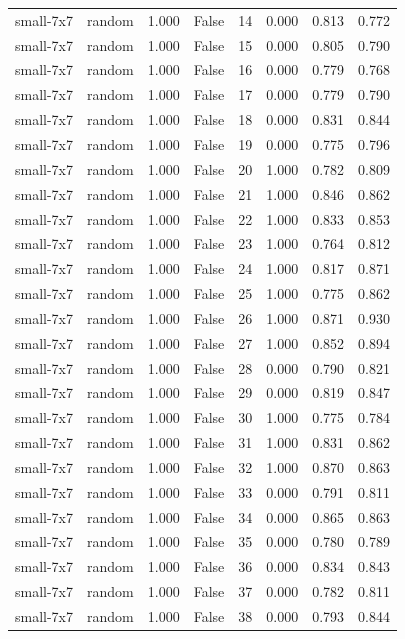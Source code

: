 \begin{tabular}{llrrrrrr}
small-7x7 & random & 1.000 & False & 14 & 0.000 & 0.813 & 0.772 \\
small-7x7 & random & 1.000 & False & 15 & 0.000 & 0.805 & 0.790 \\
small-7x7 & random & 1.000 & False & 16 & 0.000 & 0.779 & 0.768 \\
small-7x7 & random & 1.000 & False & 17 & 0.000 & 0.779 & 0.790 \\
small-7x7 & random & 1.000 & False & 18 & 0.000 & 0.831 & 0.844 \\
small-7x7 & random & 1.000 & False & 19 & 0.000 & 0.775 & 0.796 \\
small-7x7 & random & 1.000 & False & 20 & 1.000 & 0.782 & 0.809 \\
small-7x7 & random & 1.000 & False & 21 & 1.000 & 0.846 & 0.862 \\
small-7x7 & random & 1.000 & False & 22 & 1.000 & 0.833 & 0.853 \\
small-7x7 & random & 1.000 & False & 23 & 1.000 & 0.764 & 0.812 \\
small-7x7 & random & 1.000 & False & 24 & 1.000 & 0.817 & 0.871 \\
small-7x7 & random & 1.000 & False & 25 & 1.000 & 0.775 & 0.862 \\
small-7x7 & random & 1.000 & False & 26 & 1.000 & 0.871 & 0.930 \\
small-7x7 & random & 1.000 & False & 27 & 1.000 & 0.852 & 0.894 \\
small-7x7 & random & 1.000 & False & 28 & 0.000 & 0.790 & 0.821 \\
small-7x7 & random & 1.000 & False & 29 & 0.000 & 0.819 & 0.847 \\
small-7x7 & random & 1.000 & False & 30 & 1.000 & 0.775 & 0.784 \\
small-7x7 & random & 1.000 & False & 31 & 1.000 & 0.831 & 0.862 \\
small-7x7 & random & 1.000 & False & 32 & 1.000 & 0.870 & 0.863 \\
small-7x7 & random & 1.000 & False & 33 & 0.000 & 0.791 & 0.811 \\
small-7x7 & random & 1.000 & False & 34 & 0.000 & 0.865 & 0.863 \\
small-7x7 & random & 1.000 & False & 35 & 0.000 & 0.780 & 0.789 \\
small-7x7 & random & 1.000 & False & 36 & 0.000 & 0.834 & 0.843 \\
small-7x7 & random & 1.000 & False & 37 & 0.000 & 0.782 & 0.811 \\
small-7x7 & random & 1.000 & False & 38 & 0.000 & 0.793 & 0.844 \\

\end{tabular}
